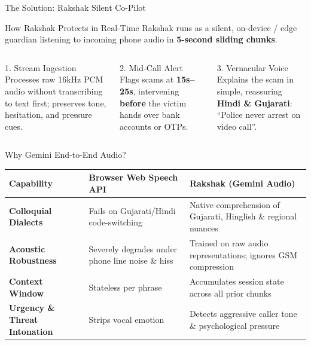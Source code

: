 \documentclass[aspectratio=169,10pt]{beamer}
\begin{document}
\begin{frame}{The Solution: Rakshak Silent Co-Pilot}
\begin{block}{How Rakshak Protects in Real-Time}
Rakshak runs as a silent, on-device / edge guardian listening to incoming phone audio in \textbf{5-second sliding chunks}.
\end{block}
\vspace{0.3cm}
\begin{columns}[T]
\begin{block}{1. Stream Ingestion}
Processes raw 16kHz PCM audio without transcribing to text first; preserves tone, hesitation, and pressure cues.
\end{block}

\begin{alertblock}{2. Mid-Call Alert}
Flags scams at \textbf{15s--25s}, intervening \textbf{before} the victim hands over bank accounts or OTPs.
\end{alertblock}

\begin{exampleblock}{3. Vernacular Voice}
Explains the scam in simple, reassuring \textbf{Hindi \& Gujarati}: ``Police never arrest on video call''.
\end{exampleblock}
\end{columns}
\end{frame}

\begin{frame}{Why Gemini End-to-End Audio?}
\begin{table}[]
\centering
\small
\begin{tabular}{p{3.8cm} p{5cm} p{5cm}}
\toprule
\textbf{Capability} & \textbf{Browser Web Speech API} & \textbf{Rakshak (Gemini Audio)} \\
\midrule
\textbf{Colloquial Dialects} & Fails on Gujarati/Hindi code-switching & Native comprehension of Gujarati, Hinglish \& regional nuances \\
\midrule
\textbf{Acoustic Robustness} & Severely degrades under phone line noise \& hiss & Trained on raw audio representations; ignores GSM compression \\
\midrule
\textbf{Context Window} & Stateless per phrase & Accumulates session state across all prior chunks \\
\midrule
\textbf{Urgency \& Threat Intonation} & Strips vocal emotion & Detects aggressive caller tone \& psychological pressure \\
\bottomrule
\end{tabular}
\end{table}
\end{frame}
\end{document}
